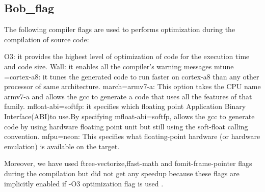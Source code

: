 \subsection{Bob_flag}
 
 The following compiler flags are used to performs optimization during the compilation of source code: 

O3: it provides the highest level of optimization of code for the execution time and code size.
Wall: it enables all the compiler's warning messages 
mtune =cortex-a8:  it tunes the generated code to run faster on cortex-a8 than any other processor of same architecture.
march=armv7-a: This option takes the CPU name armv7-a and allows the gcc to generate a code that uses all the features of that family.      
mfloat-abi=softfp: it specifies which floating point Application Binary Interface(ABI)to use.By specifying mfloat-abi=softfp, allows the gcc to generate code by using hardware floating point unit but still using the soft-float calling convention.
mfpu=neon: This specifies what floating-point hardware (or hardware emulation) is available on the target.

Moreover, we have used ftree-vectorize,ffast-math and fomit-frame-pointer flags during the compilation but did not get any speedup because these flags are implicitly enabled if -O3 optimization flag is used .            

